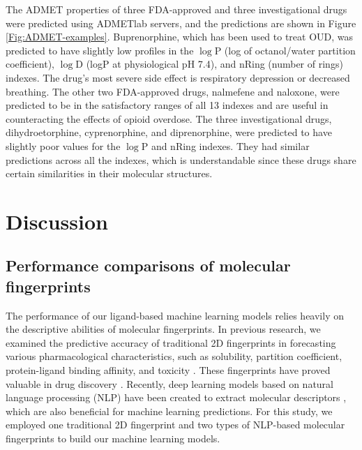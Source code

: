 \documentclass[10pt]{article}
\begin{document}
		The ADMET properties of three FDA-approved and three investigational drugs were predicted using ADMETlab servers, and the predictions are shown in Figure \ref{Fig:ADMET-examples}. Buprenorphine, which has been used to treat OUD, was predicted to have slightly low profiles in the $\log$P (log of octanol/water partition coefficient), $\log$D (logP at physiological pH 7.4), and nRing (number of rings) indexes. The drug's most severe side effect is respiratory depression or decreased breathing. The other two FDA-approved drugs, nalmefene and naloxone, were predicted to be in the satisfactory ranges of all 13 indexes and are useful in counteracting the effects of opioid overdose. The three investigational drugs, dihydroetorphine, cyprenorphine, and diprenorphine, were predicted to have slightly poor values for the $\log$P and nRing indexes. They had similar predictions across all the indexes, which is understandable since these drugs share certain similarities in their molecular structures.
		
		\section{Discussion}
		
		
		\subsection{Performance comparisons of molecular fingerprints}
		
		The performance of our ligand-based machine learning models relies heavily on the descriptive abilities of molecular fingerprints. In previous research, we examined the predictive accuracy of traditional 2D fingerprints in forecasting various pharmacological characteristics, such as solubility, partition coefficient, protein-ligand binding affinity, and toxicity \cite{gao20202d}. These fingerprints have proved valuable in drug discovery \cite{gao2020repositioning}. Recently, deep learning models based on natural language processing (NLP) have been created to extract molecular descriptors \cite{chen2021extracting, winter2019learning}, which are also beneficial for machine learning predictions. For this study, we employed one traditional 2D fingerprint and two types of NLP-based molecular fingerprints to build our machine learning models.
		
\end{document}
